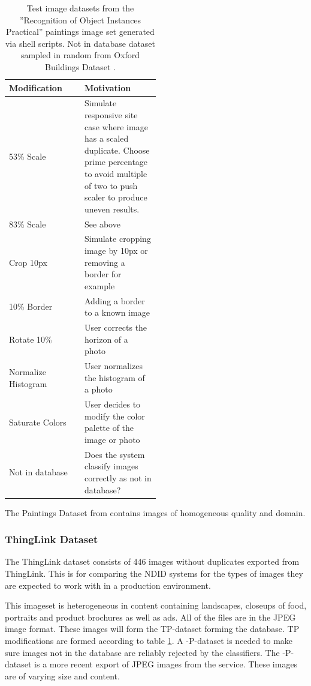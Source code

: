 \documentclass[english,12pt,a4paper,pdftex,elec,utf8, table]{aaltothesis}
\begin{document}
\def\arraystretch{1.5}
\begin{table}[htb]
\caption{Test image datasets from the ''Recognition of Object Instances Practical'' \cite{Vedaldi2012} paintings image set generated via shell scripts. Not in database dataset sampled in random from Oxford Buildings Dataset \cite{PhilbinJamesArandjelovicReljaZisserman2012}.}
\label{modifiedimages}
\begin{center}
\begin{tabular}{lp{0.5\linewidth}}
  Modification & Motivation \\
  \hline \hline
  53\% Scale& Simulate responsive site case where image has a scaled duplicate. Choose prime percentage to avoid multiple of two to push scaler to produce uneven results.\\
  \hline
  83\% Scale& See above \\
  \hline
  Crop 10px & Simulate cropping image by 10px or removing a border for example\\
  \hline
  10\% Border & Adding a border to a known image \\
  \hline
  Rotate 10\% & User corrects the horizon of a photo \\
  \hline
  Normalize Histogram & User normalizes the histogram of a photo\\
  \hline
  Saturate Colors & User decides to modify the color palette of the image or photo\\
  \hline
  Not in database & Does the system classify images correctly as not in database?\\
\end{tabular}
\end{center}\end{table}

The Paintings Dataset from \cite{Vedaldi2012} contains images of homogeneous quality and domain.

\subsubsection{ThingLink Dataset}
The ThingLink dataset consists of 446 images without duplicates exported from ThingLink. This is for comparing the NDID systems for the types of images they are expected to work with in a production environment.

This imageset is heterogeneous in content containing landscapes, closeups of food, portraits and product brochures as well as ads. All of the files are in the JPEG image format. These images will form the TP-dataset forming the database. TP modifications are formed according to table \ref{modifiedimages}. A -P-dataset is needed to make sure images not in the database are reliably rejected by the classifiers. The -P-dataset is a more recent export of JPEG images from the service. These images are of varying size and content.
\end{document}
